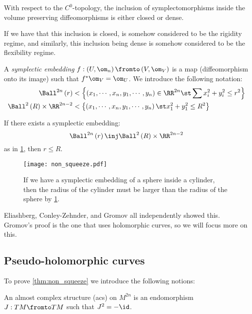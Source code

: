 \documentclass{amsart}
\begin{document}
\begin{thm}[Gromov]
With respect to the $C^0$-topology, 
the inclusion of symplectomorphisms inside the volume preserving
diffeomorphisms is either closed or dense.
\end{thm}

If we have that this inclusion is closed, is somehow considered to be
the rigidity regime, and similarly, this inclusion being dense is somehow
considered to be the flexibility regime.

A \emph{symplectic embedding}
$f: \left( U , \om_n \right) \fromto \left( V, \om_V \right)$ is a map
(diffeomorphism onto its image) such that $f^* \om_V= \om_U$.
We introduce the following notation:
\begin{align}
\Ball^{2n}\left( r \right) & <
\left\{ \left( x_1 , \cdots , x_n , y_1 , \cdots , y_n \right) \in \RR^{2n}\st
\sum x_i^2 + y_i^2\leq r^2\right\}\\
\Ball^2\left( R \right) \times \RR^{2n-2} & <
\left\{ \left( x_1 , \cdots , x_n , y_1 , \cdots, y_n \right) \st
x_1^2 + y_1^2 \leq R^2\right\}
\end{align}

\begin{thm}
If there exists a symplectic embedding:
\begin{equation}
\Ball^{2n}\left( r \right) \inj \Ball^2\left( R \right) \times \RR^{2n-2}
\end{equation}
as in \cref{fig:non_squeeze}, then $r\leq R$.
\label{thm:non_squeeze}
\end{thm}

\begin{figure}
\texttt{[image: non\_squeeze.pdf]}
\caption{If we have a symplectic embedding of a sphere inside 
a cylinder, then the radius of the cylinder must be larger than the radius of the 
sphere by \cref{fig:non_squeeze}.}
\label{fig:non_squeeze}
\end{figure}

Eliashberg, Conley-Zehnder, and Gromov all independently showed this.
Gromov's proof is the one that uses holomorphic curves, so we will focus more on this.

\subsection{Pseudo-holomorphic curves}

To prove \cref{thm:non_squeeze} we introduce the following notions:

\begin{defn}
An almost complex structure (acs) on $M^{2n}$ is an endomorphism 
$J:TM\fromto TM$ such that $J^2 = -\id$.
\end{defn}
\end{document}
